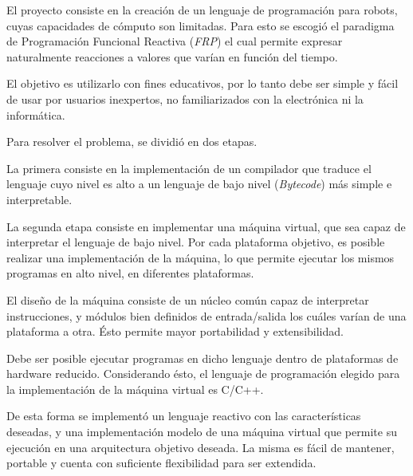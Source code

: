 

El proyecto consiste en la creación de un lenguaje de programación
para robots, cuyas capacidades de cómputo son limitadas.
Para esto se escogió el paradigma de Programación Funcional Reactiva
(\emph{FRP}) el cual permite expresar naturalmente reacciones a
valores que varían en función del tiempo.

El objetivo es utilizarlo con fines educativos,
por lo tanto debe ser simple y fácil de usar por usuarios
inexpertos, no familiarizados con la electrónica ni la informática.

Para resolver el problema, se dividió en dos etapas.

La primera consiste en la implementación de
un compilador que traduce el lenguaje cuyo nivel es alto a
un lenguaje de bajo nivel (\emph{Bytecode}) más simple e interpretable.

La segunda etapa consiste en implementar una máquina virtual, que
sea capaz de interpretar el lenguaje de bajo nivel.
Por cada plataforma objetivo, es posible realizar una implementación de
la máquina, lo que permite ejecutar los mismos
programas en alto nivel, en diferentes plataformas.

El diseño de la máquina consiste de un núcleo común capaz de interpretar
instrucciones, y módulos bien definidos de
entrada/salida los cuáles varían de una plataforma a otra.
Ésto permite mayor portabilidad y extensibilidad.

Debe ser posible ejecutar programas en dicho lenguaje dentro de plataformas
de hardware reducido.
Considerando ésto, el lenguaje de programación elegido para la
implementación de la máquina virtual es C/C++.

De esta forma se implementó un lenguaje reactivo con las
características deseadas, y una implementación modelo de una máquina
virtual que permite
su ejecución en una arquitectura objetivo deseada.
La misma es fácil de mantener, portable y cuenta con suficiente
flexibilidad para ser extendida.
